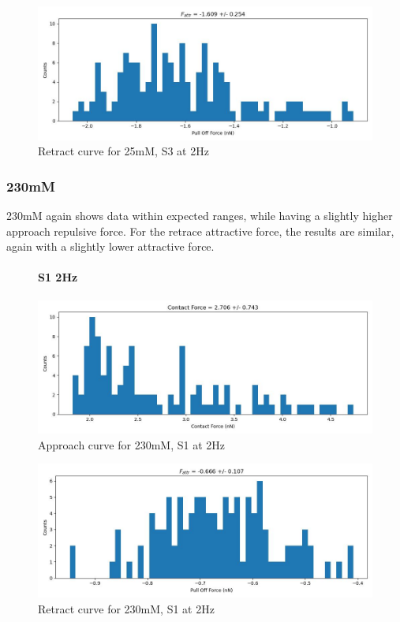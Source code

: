 \begin{figure}[h!]
\centering
\includegraphics[width=\textwidth]{chapter7/Tip speed/25mM/S3 2Hz/retract_f_a_hist.jpg}
\caption{Retract curve for 25mM, S3 at 2Hz}
\end{figure}

\newpage

\subsubsection*{230mM}
230mM again shows data within expected ranges, while having a slightly higher approach repulsive force. For the retrace attractive force, the results are similar, again with a slightly lower attractive force.
\begin{figure}[h!]
\paragraph{S1 2Hz}
\centering
\includegraphics[width=\textwidth]{chapter7/Tip speed/230mM/S1 2Hz/approach_f_c_hist.jpg}
\caption{Approach curve for 230mM, S1 at 2Hz}
\end{figure}

\begin{figure}[h!]
\centering
\includegraphics[width=\textwidth]{chapter7/Tip speed/230mM/S1 2Hz/retract_f_a_hist.jpg}
\caption{Retract curve for 230mM, S1 at 2Hz}
\end{figure}

